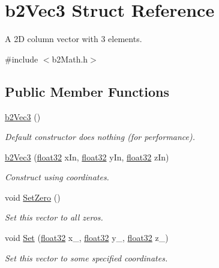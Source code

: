 \hypertarget{structb2_vec3}{}\section{b2\+Vec3 Struct Reference}
\label{structb2_vec3}


A 2D column vector with 3 elements.  




{\ttfamily \#include $<$b2\+Math.\+h$>$}

\subsection*{Public Member Functions}
\begin{DoxyCompactItemize}
\item 
\mbox{\hyperlink{structb2_vec3_a837423f66d6fb72d815e7390c09938b9}{b2\+Vec3}} ()
\begin{DoxyCompactList}\small\item\em Default constructor does nothing (for performance). \end{DoxyCompactList}\item 
\mbox{\hyperlink{structb2_vec3_a5db4043a3ea58894562081f1f68195d9}{b2\+Vec3}} (\mbox{\hyperlink{b2_settings_8h_aacdc525d6f7bddb3ae95d5c311bd06a1}{float32}} x\+In, \mbox{\hyperlink{b2_settings_8h_aacdc525d6f7bddb3ae95d5c311bd06a1}{float32}} y\+In, \mbox{\hyperlink{b2_settings_8h_aacdc525d6f7bddb3ae95d5c311bd06a1}{float32}} z\+In)
\begin{DoxyCompactList}\small\item\em Construct using coordinates. \end{DoxyCompactList}\item 
void \mbox{\hyperlink{structb2_vec3_a5a459ed49f1910a347ca247f848a2dd8}{Set\+Zero}} ()
\begin{DoxyCompactList}\small\item\em Set this vector to all zeros. \end{DoxyCompactList}\item 
void \mbox{\hyperlink{structb2_vec3_a12a1bc14bbe722dfb175a492d2d00a79}{Set}} (\mbox{\hyperlink{b2_settings_8h_aacdc525d6f7bddb3ae95d5c311bd06a1}{float32}} x\+\_\+, \mbox{\hyperlink{b2_settings_8h_aacdc525d6f7bddb3ae95d5c311bd06a1}{float32}} y\+\_\+, \mbox{\hyperlink{b2_settings_8h_aacdc525d6f7bddb3ae95d5c311bd06a1}{float32}} z\+\_\+)
\begin{DoxyCompactList}\small\item\em Set this vector to some specified coordinates. \end{DoxyCompactList}\item 

\end{DoxyCompactItemize}
